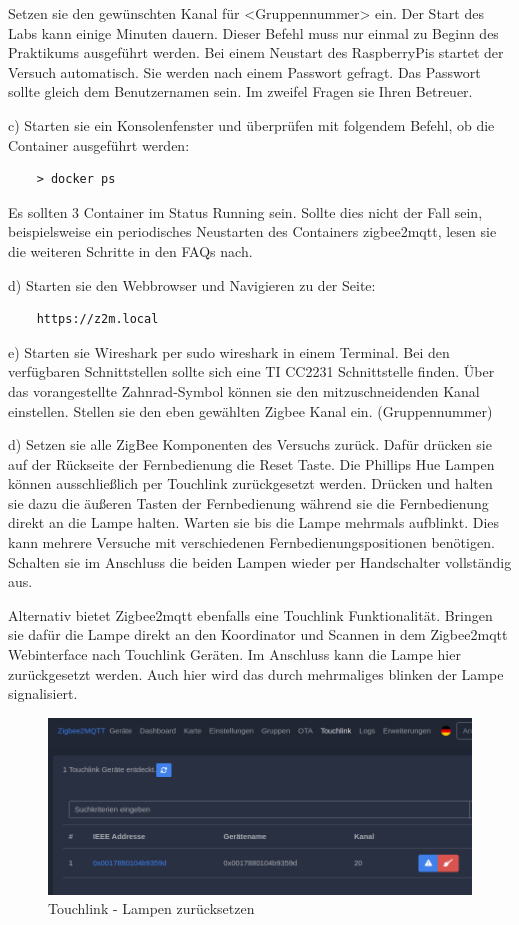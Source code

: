 Setzen sie den gewünschten Kanal für <Gruppennummer> ein. Der Start des Labs kann einige Minuten dauern. Dieser Befehl muss nur einmal zu Beginn
des Praktikums ausgeführt werden. Bei einem Neustart des RaspberryPis startet der Versuch automatisch. Sie werden nach einem Passwort gefragt. 
Das Passwort sollte gleich dem Benutzernamen sein. Im zweifel Fragen sie Ihren Betreuer.

c) Starten sie ein Konsolenfenster und überprüfen mit folgendem Befehl, ob die Container ausgeführt werden:
\begin{lstlisting}
    > docker ps
\end{lstlisting}

Es sollten 3 Container im Status \grqq Running\grqq{} sein. Sollte dies nicht der Fall sein, beispielsweise ein periodisches Neustarten des Containers 
\grqq zigbee2mqtt\grqq{}, lesen sie die weiteren Schritte in den FAQs nach.

d) Starten sie den Webbrowser und Navigieren zu der Seite:
\begin{lstlisting}
    https://z2m.local
\end{lstlisting}

e) Starten sie Wireshark per \grqq sudo wireshark\grqq{} in einem Terminal. Bei den verfügbaren Schnittstellen sollte sich eine 
\grqq TI CC2231\grqq{} Schnittstelle finden. Über das vorangestellte Zahnrad-Symbol können sie den mitzuschneidenden
 Kanal einstellen. Stellen sie den eben gewählten Zigbee Kanal ein. (Gruppennummer)

d) Setzen sie alle ZigBee Komponenten des Versuchs zurück. Dafür drücken sie auf der Rückseite der Fernbedienung die Reset Taste.
Die Phillips Hue Lampen können ausschließlich per Touchlink zurückgesetzt werden. Drücken und halten sie dazu die äußeren Tasten der Fernbedienung während sie die Fernbedienung
direkt an die Lampe halten. Warten sie bis die Lampe mehrmals aufblinkt. Dies kann mehrere Versuche mit verschiedenen Fernbedienungspositionen benötigen. Schalten sie im Anschluss
die beiden Lampen wieder per Handschalter vollständig aus.

Alternativ bietet Zigbee2mqtt ebenfalls eine Touchlink Funktionalität. Bringen sie dafür die Lampe direkt an den Koordinator und Scannen in dem Zigbee2mqtt Webinterface nach 
Touchlink Geräten. Im Anschluss kann die Lampe hier zurückgesetzt werden. Auch hier wird das durch mehrmaliges blinken der Lampe signalisiert.

\begin{figure}[H]
    \centering
    \includegraphics[width=1\textwidth]{media/z2m-touchlink.png}
    \caption{Touchlink - Lampen zurücksetzen}
\end{figure}

